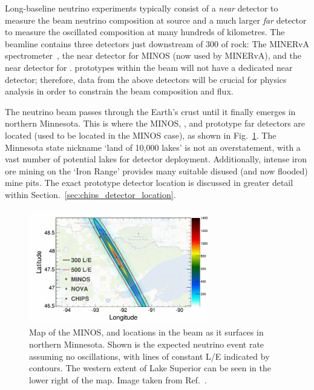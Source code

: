 Long-baseline neutrino experiments typically consist of a \emph{near} detector to measure the beam
neutrino composition at source and a much larger \emph{far} detector to measure the oscillated
composition at many hundreds of kilometres. The \numi beamline contains three detectors just
downstream of \unit{300}{} of rock: The MINERvA spectrometer~\cite{mcfarland2006}, the
near detector for MINOS (now used by MINERvA), and the near detector for \nova. \chips prototypes
within the \numi beam will not have a dedicated near detector; therefore, data from the above
detectors will be crucial for physics analysis in order to constrain the beam composition and
flux.

The \numi neutrino beam passes through the Earth's crust until it finally emerges in northern
Minnesota. This is where the MINOS, \nova, and prototype \chips far detectors are located (used to
be located in the MINOS case), as shown in Fig.~\ref{fig:numi_map}. The Minnesota state nickname
`land of 10,000 lakes' is not an overstatement, with a vast number of potential lakes for \chips
detector deployment. Additionally, intense iron ore mining on the `Iron Range' provides many
suitable disused (and now flooded) mine pits. The exact \chipsfive prototype detector location is
discussed in greater detail within Section.~\ref{sec:chips_detector_location}.

\begin{figure} %
    \includegraphics[width=0.7\textwidth]{diagrams/4-chips/numi_map.pdf}
    \caption[Map of detector locations in the \numi beam]
    {Map of the MINOS, \nova and \chips locations in the \numi beam as it surfaces in northern
        Minnesota. Shown is the expected neutrino event rate assuming no oscillations, with lines
        of constant L/E indicated by contours. The western extent of Lake Superior can be seen in
        the lower right of the map. Image taken from Ref.~\cite{adamson2013}.}
    \label{fig:numi_map}
\end{figure}

